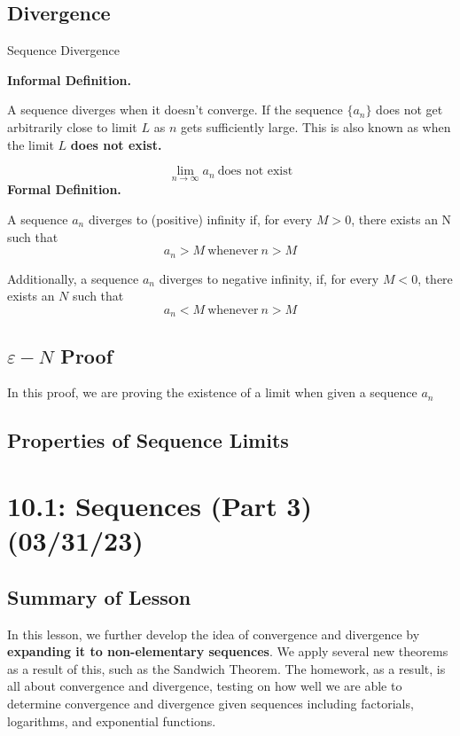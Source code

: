 \documentclass{report}
\begin{document}
\begin{sloppypar}
\section{Divergence}
\begin{center}
      \dfn
        {Sequence Divergence}
      {\textbf{Informal Definition.}
      \par
      A sequence diverges when it doesn't converge. If the sequence
      $ \{ a_{n }\} $ does not get arbitrarily close to limit $ L $
      as $ n $ gets sufficiently large. This is also known as
      when the limit $ L $ \textbf{does not exist.}
      \par
      \[ \lim_{n\rightarrow\infty}a_{n} ~ \textrm{does not exist}\]
      \textbf{Formal Definition.}
      \par
      A sequence $ { a_{n} }$ diverges to (positive) infinity if, for every
      $ M > 0 $, there exists an N such that
      \[ a_{n} > M ~ \textrm{whenever}~ n > M \]

      Additionally, a sequence $ { a_{n} } $ diverges to negative
      infinity, if, for every $ M < 0 $, there exists an $ N $
      such that
      \[ a_{n} < M ~ \textrm{whenever} ~ n > M \]
  }
\end{center}

\section{$\varepsilon-N$ Proof}
In this proof, we are proving the existence of a limit
when given a sequence $a_{n}$
\section{Properties of Sequence Limits}

\chapter{10.1: Sequences (Part 3) (03/31/23)}
\section{Summary of Lesson}
In this lesson, we further develop the idea of convergence
and divergence by \textbf{expanding it to non-elementary sequences}. We
apply several new theorems as a result of this, such as the
Sandwich Theorem. The homework, as a result, is all about
convergence and divergence, testing on how well we are
able to determine convergence and divergence given sequences
including factorials, logarithms, and exponential functions.

\end{sloppypar}
\end{document}
